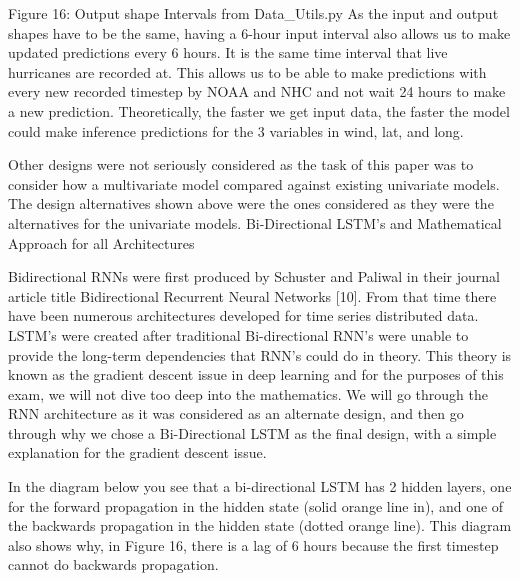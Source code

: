 \documentclass{article}
\begin{document}
Figure 16: Output shape Intervals from Data_Utils.py
As the input and output shapes have to be the same, having a 6-hour input interval also allows us to make updated predictions every 6 hours. It is the same time interval that live hurricanes are recorded at. This allows us to be able to make predictions with every new recorded timestep by NOAA and NHC and not wait 24 hours to make a new prediction. Theoretically, the faster we get input data, the faster the model could make inference predictions for the 3 variables in wind, lat, and long. 

Other designs were not seriously considered as the task of this paper was to consider how a multivariate model compared against existing univariate models. The design alternatives shown above were the ones considered as they were the alternatives for the univariate models.
Bi-Directional LSTM’s and Mathematical Approach for all Architectures

Bidirectional RNNs were first produced by Schuster and Paliwal in their journal article title Bidirectional Recurrent Neural Networks [10]. From that time there have been numerous architectures developed for time series distributed data. LSTM’s were created after traditional Bi-directional RNN’s were unable to provide the long-term dependencies that RNN’s could do in theory. This theory is known as the gradient descent issue in deep learning and for the purposes of this exam, we will not dive too deep into the mathematics. We will go through the RNN architecture as it was considered as an alternate design, and then go through why we chose a Bi-Directional LSTM as the final design, with a simple explanation for the gradient descent issue.

In the diagram below you see that a bi-directional LSTM has 2 hidden layers, one for the forward propagation in the hidden state (solid orange line in), and one of the backwards propagation in the hidden state (dotted orange line). This diagram also shows why, in Figure 16, there is a lag of 6 hours because the first timestep cannot do backwards propagation.
\end{document}
